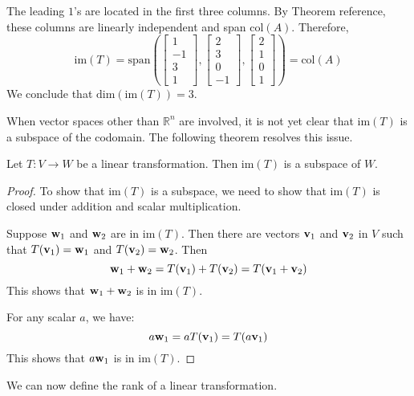 \documentclass{ximera}
\renewcommand{\vec}[1]{{\bf #1}}
\newcommand{\RR}{\mathbb{R}}
\begin{document}
\begin{example}
\begin{explanation}
The leading $1$'s are located in the first three columns.  By Theorem {\color{red} reference}, these columns are linearly independent and span $\text{col}(A)$.  Therefore,
$$\text{im}(T)=\text{span}\left(\begin{bmatrix}1\\-1\\3\\1\end{bmatrix}, \begin{bmatrix}2\\3\\0\\-1\end{bmatrix}, \begin{bmatrix}2\\1\\0\\1\end{bmatrix}\right)=\text{col}(A)$$
We conclude that $\text{dim}(\text{im}(T))=3$.

\end{explanation}
\end{example}

When vector spaces other than $\RR^n$ are involved, it is not yet clear that $\text{im}(T)$ is a subspace of the codomain. The following theorem resolves this issue.

\begin{theorem}\label{th:imagesubspace}
Let $T:V\rightarrow W$ be a linear transformation.  Then $\text{im}(T)$ is a subspace of $W$.
\end{theorem}
\begin{proof}
To show that $\text{im}(T)$ is a subspace, we need to show that $\text{im}(T)$ is closed under addition and scalar multiplication.

Suppose $\vec{w}_1$ and $\vec{w}_2$ are in $\text{im}(T)$.  Then there are vectors $\vec{v}_1$ and $\vec{v}_2$ in $V$ such that $T(\vec{v}_1)=\vec{w}_1$ and $T(\vec{v}_2)=\vec{w}_2$.  Then
$$\vec{w}_1+\vec{w}_2=T(\vec{v}_1)+T(\vec{v}_2)=T(\vec{v}_1+\vec{v}_2)$$
This shows that $\vec{w}_1+\vec{w}_2$ is in $\text{im}(T)$.

For any scalar $a$, we have:
$$a\vec{w}_1=aT(\vec{v}_1)=T(a\vec{v}_1)$$
This shows that $a\vec{w}_1$ is in $\text{im}(T)$.
\end{proof}

We can now define the rank of a linear transformation.
\end{document}
